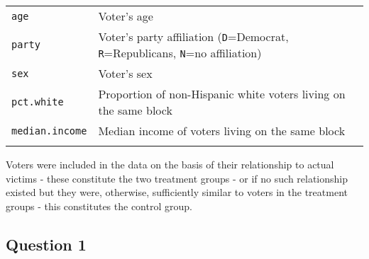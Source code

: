 \documentclass[]{article}
\begin{document}
\begin{longtable}[c]{@{}ll@{}}
\\\addlinespace
\begin{minipage}[t]{0.24\columnwidth}\raggedright
\texttt{age}
\end{minipage} & \begin{minipage}[t]{0.69\columnwidth}\raggedright
Voter's age
\end{minipage}
\\\addlinespace
\begin{minipage}[t]{0.24\columnwidth}\raggedright
\texttt{party}
\end{minipage} & \begin{minipage}[t]{0.69\columnwidth}\raggedright
Voter's party affiliation (\texttt{D}=Democrat, \texttt{R}=Republicans,
\texttt{N}=no affiliation)
\end{minipage}
\\\addlinespace
\begin{minipage}[t]{0.24\columnwidth}\raggedright
\texttt{sex}
\end{minipage} & \begin{minipage}[t]{0.69\columnwidth}\raggedright
Voter's sex
\end{minipage}
\\\addlinespace
\begin{minipage}[t]{0.24\columnwidth}\raggedright
\texttt{pct.white}
\end{minipage} & \begin{minipage}[t]{0.69\columnwidth}\raggedright
Proportion of non-Hispanic white voters living on the same block
\end{minipage}
\\\addlinespace
\begin{minipage}[t]{0.24\columnwidth}\raggedright
\texttt{median.income}
\end{minipage} & \begin{minipage}[t]{0.69\columnwidth}\raggedright
Median income of voters living on the same block
\end{minipage}
\\\addlinespace
\bottomrule
\end{longtable}

Voters were included in the data on the basis of their relationship to
actual victims - these constitute the two treatment groups - or if no
such relationship existed but they were, otherwise, sufficiently similar
to voters in the treatment groups - this constitutes the control group.

\subsection{Question 1}\label{question-1}
\end{document}
